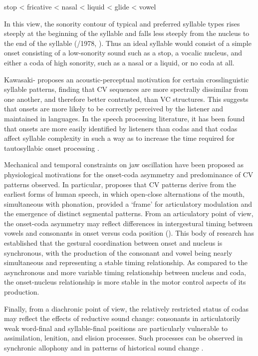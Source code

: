 \ea\label{ex:1.6}
  stop < fricative < nasal < liquid < glide < vowel
\z

In this view, the sonority contour of typical and preferred syllable types rises steeply at the beginning of the syllable and falls less steeply from the nucleus to the end of the syllable (\citealt{Zwicky1972,Hooper1976,Greenberg1965}/1978, \citealt{Clements1990}). Thus an ideal syllable would consist of a simple onset consisting of a low-sonority sound such as a stop, a vocalic nucleus, and either a coda of high sonority, such as a nasal or a liquid, or no coda at all.

  Kawasaki-\citet{Fukumori1992} proposes an acoustic-perceptual motivation for certain crosslinguistic syllable patterns, finding that CV sequences are more spectrally dissimilar from one another, and therefore better contrasted, than VC structures. This suggests that onsets are more likely to be correctly perceived by the listener and maintained in languages. In the speech processing literature, it has been found that onsets are more easily identified by listeners than codas \citep{ContentEtAl2001} and that codas affect syllable complexity in such a way as to increase the time required for tautosyllabic onset processing \citep{SeguiEtAl1991}. 

  Mechanical and temporal constraints on jaw oscillation have been proposed as physiological motivations for the onset-coda asymmetry and predominance of CV patterns observed. In particular, \citet{MacNeilage1998} proposes that CV patterns derive from the earliest forms of human speech, in which open-close alternations of the mouth, simultaneous with phonation, provided a ‘frame’ for articulatory modulation and the emergence of distinct segmental patterns. From an articulatory point of view, the onset-coda asymmetry may reflect differences in intergestural timing between vowels and consonants in onset versus coda position (\citealt{Byrd1996a,BrowmanGoldstein1995,GickEtAl2006,MarinPouplier2010}). This body of research has established that the gestural coordination between onset and nucleus is synchronous, with the production of the consonant and vowel being nearly simultaneous and representing a stable timing relationship. As compared to the asynchronous and more variable timing relationship between nucleus and coda, the onset-nucleus relationship is more stable in the motor control aspects of its production.

  Finally, from a diachronic point of view, the relatively restricted status of codas may reflect the effects of reductive sound change: consonants in articulatorily weak word-final and syllable-final positions are particularly vulnerable to assimilation, lenition, and elision processes. Such processes can be observed in synchronic allophony and in patterns of historical sound change \citep{Bybee2015b}.

